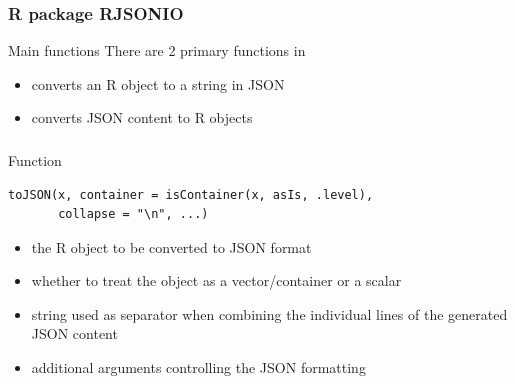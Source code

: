 \documentclass{beamer}\usepackage[]{graphicx}\usepackage[]{color}
\begin{document}

\begin{frame}[fragile]
\frametitle{R package RJSONIO}

\begin{block}{Main functions}
There are 2 primary functions in 
\begin{itemize}
 \item {} converts an R object to a string in JSON
 \item {} converts JSON content to R objects
\end{itemize}
\end{block}

\end{frame}


\begin{frame}[fragile]
\frametitle{}

\begin{block}{Function }
\begin{verbatim}
toJSON(x, container = isContainer(x, asIs, .level), 
       collapse = "\n", ...)
\end{verbatim}

\begin{itemize}
 \item {} the R object to be converted to JSON format
 \item {} whether to treat the object as a vector/container or a scalar 
 \item {} string used as separator when combining the individual lines of the generated JSON content
 \item {} additional arguments controlling the JSON formatting
\end{itemize}
\end{block}

\end{frame}

\end{document}
